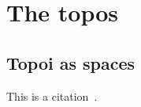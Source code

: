 \section{The topos}
\label{topoi:0001}
\lipsum

\subsection{Topoi as spaces}
\lipsum[3]
This is a citation~\cite{Sterling22}.
